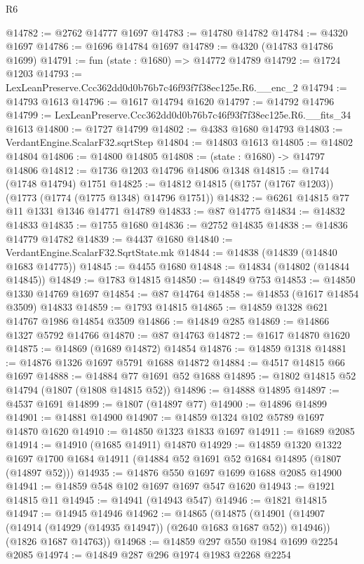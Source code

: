 \begin{lexlean}{R6}
\begin{coremodule}
@14782 := @2762 @14777 @1697
@14783 := @14780 @14782
@14784 := @4320 @1697
@14786 := @1696 @14784 @1697
@14789 := @4320 (@14783 @14786 @1699)
@14791 := fun (state : @1680) => @14772 @14789
@14792 := @1724 @1203
@14793 := LexLeanPreserve.Ccc362dd0d0b76b7c46f93f7f38ec125e.R6.__enc_2
@14794 := @14793 @1613
@14796 := @1617 @14794 @1620
@14797 := @14792 @14796
@14799 := LexLeanPreserve.Ccc362dd0d0b76b7c46f93f7f38ec125e.R6.__fits_34 @1613
@14800 := @1727 @14799
@14802 := @4383 @1680 @14793
@14803 := VerdantEngine.ScalarF32.sqrtStep
@14804 := @14803 @1613
@14805 := @14802 @14804
@14806 := @14800 @14805
@14808 := (state : @1680) -> @14797 @14806
@14812 := @1736 @1203 @14796 @14806 @1348
@14815 := @1744 (@1748 @14794) @1751
@14825 := @14812 @14815 (@1757 (@1767 @1203)) (@1773 (@1774 (@1775 @1348) @14796 @1751))
@14832 := @6261 @14815 @77 @11 @1331 @1346 @14771 @14789
@14833 := @87 @14775
@14834 := @14832 @14833
@14835 := @1755 @1680
@14836 := @2752 @14835
@14838 := @14836 @14779 @14782
@14839 := @4437 @1680
@14840 := VerdantEngine.ScalarF32.SqrtState.mk
@14844 := @14838 (@14839 (@14840 @1683 @14775))
@14845 := @4455 @1680
@14848 := @14834 (@14802 (@14844 @14845))
@14849 := @1783 @14815
@14850 := @14849 @753
@14853 := @14850 @1330 @14769 @1697
@14854 := @87 @14764
@14858 := @14853 (@1617 @14854 @3509) @14833
@14859 := @1793 @14815
@14865 := @14859 @1328 @621 @14767 @1986 @14854 @3509
@14866 := @14849 @285
@14869 := @14866 @1327 @5792 @14766
@14870 := @87 @14763
@14872 := @1617 @14870 @1620
@14875 := @14869 (@1689 @14872) @14854
@14876 := @14859 @1318
@14881 := @14876 @1326 @1697 @5791 @1688 @14872
@14884 := @4517 @14815 @66 @1697
@14888 := @14884 @77 @1691 @52 @1688
@14895 := @1802 @14815 @52 @14794 (@1807 (@1808 @14815 @52))
@14896 := @14888 @14895
@14897 := @4537 @1691
@14899 := @1807 (@14897 @77)
@14900 := @14896 @14899
@14901 := @14881 @14900
@14907 := @14859 @1324 @102 @5789 @1697 @14870 @1620
@14910 := @14850 @1323 @1833 @1697
@14911 := @1689 @2085
@14914 := @14910 (@1685 @14911) @14870
@14929 := @14859
    @1320
    @1322
    @1697
    @1700
    @1684
    @14911
    (@14884 @52 @1691 @52 @1684 @14895 (@1807 (@14897 @52)))
@14935 := @14876 @550 @1697 @1699 @1688 @2085 @14900
@14941 := @14859 @548 @102 @1697 @1697 @547 @1620
@14943 := @1921 @14815 @11
@14945 := @14941 (@14943 @547)
@14946 := @1821 @14815
@14947 := @14945 @14946
@14962 := @14865
    (@14875
      (@14901 (@14907 (@14914 (@14929 (@14935 @14947)) (@2640 @1683 @1687 @52)) @14946))
      (@1826 @1687 @14763))
@14968 := @14859 @297 @550 @1984 @1699 @2254 @2085
@14974 := @14849 @287 @296 @1974 @1983 @2268 @2254

\end{coremodule}
\end{lexlean}
